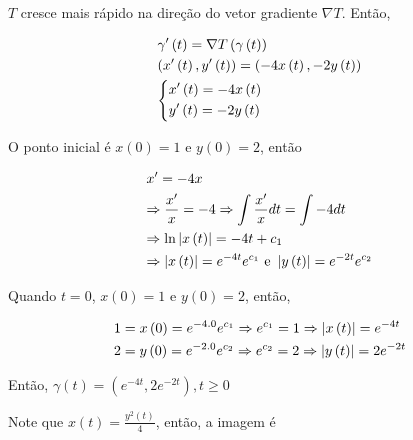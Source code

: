 \documentclass{book}
\begin{document}
\begin{enumerate}
\begin{sol}
$T$ cresce mais r\'apido na dire\c{c}\~ao do vetor gradiente $\nabla T$. Ent\~ao,

\[
\begin{gathered}
  \gamma '\left( t \right) = \nabla T\left( {\gamma \left( t \right)} \right) \hfill \\
  \left( {x'\left( t \right),y'\left( t \right)} \right) = \left( { - 4x\left( t \right), - 2y\left( t \right)} \right) \hfill \\
  \left\{ \begin{gathered}
  x'\left( t \right) =  - 4x\left( t \right) \hfill \\
  y'\left( t \right) =  - 2y\left( t \right) \hfill \\
\end{gathered}  \right. \hfill \\
\end{gathered}
\]

O ponto inicial \'e $x(0)=1$ e $y(0)=2$, ent\~ao

\[
\begin{gathered}
  x' =  - 4x \hfill \\
   \Rightarrow \frac{{x'}}
{x} =  - 4 \Rightarrow \int {\frac{{x'}}
{x}dt = \int { - 4dt} }  \hfill \\
   \Rightarrow \ln \left| {x\left( t \right)} \right| =  - 4t + c_1  \hfill \\
   \Rightarrow \left| {x\left( t \right)} \right| = e^{ - 4t} e^{c_1 } {\text{ e }}\left| {y\left( t \right)} \right| = e^{ - 2t} e^{c_2 }  \hfill \\
\end{gathered}
\]

Quando $t=0$, $x(0)=1$ e $y(0)=2$, ent\~ao,

\[
\begin{gathered}
  1 = x\left( 0 \right) = e^{ - 4.0} e^{c_1 }  \Rightarrow e^{c_1 }  = 1 \Rightarrow \left| {x\left( t \right)} \right| = e^{ - 4t}  \hfill \\
  2 = y\left( 0 \right) = e^{ - 2.0} e^{c_2 }  \Rightarrow e^{c_2 }  = 2 \Rightarrow \left| {y\left( t \right)} \right| = 2e^{ - 2t}  \hfill \\
\end{gathered}
\]

Ent\~ao, $\gamma \left( t \right) = \left( {e^{ - 4t} ,2e^{ - 2t} } \right),t \geqslant 0$

Note que $x\left( t \right) = \frac{{y^2 \left( t \right)}}{4}$, ent\~ao, a imagem \'e


\end{sol}

\end{enumerate}
\end{document}
